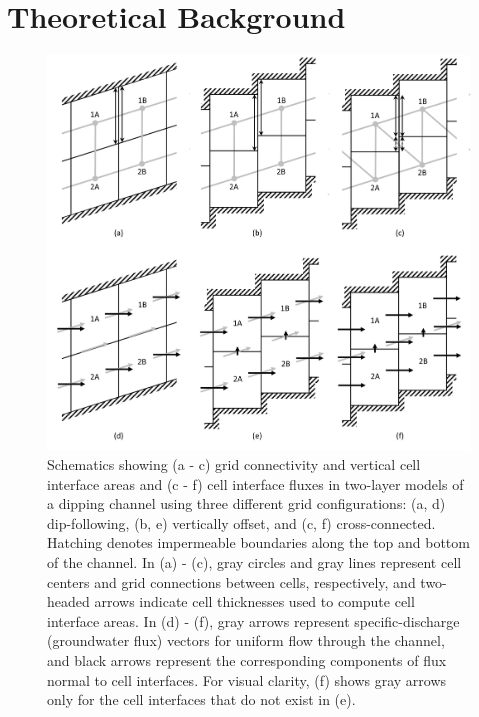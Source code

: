 \documentclass{article}
\begin{document}
\section{Theoretical Background}

\begin{figure}
	\begin{center}
	\includegraphics[scale=0.4]{../figures/schem_conn_area_flux_resaved.png}
	\caption{Schematics showing (a - c) grid connectivity and vertical cell interface areas and (c - f) cell interface fluxes in two-layer models of a dipping channel using three different grid configurations: (a, d) dip-following, (b, e) vertically offset, and (c, f) cross-connected. Hatching denotes impermeable boundaries along the top and bottom of the channel. In (a) - (c), gray circles and gray lines represent cell centers and grid connections between cells, respectively, and two-headed arrows indicate cell thicknesses used to compute cell interface areas. In (d) - (f), gray arrows represent specific-discharge (groundwater flux) vectors for uniform flow through the channel, and black arrows represent the corresponding components of flux normal to cell interfaces. For visual clarity, (f) shows gray arrows only for the cell interfaces that do not exist in (e).}
	\label{fig:schem-conn-area-flux}
	\end{center}
\end{figure}
\end{document}
